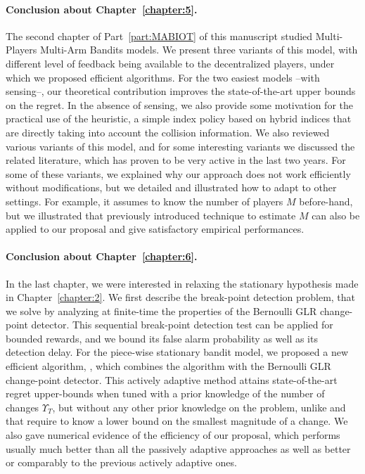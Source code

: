 \paragraph{Conclusion about \textbf{Chapter~\ref{chapter:5}}.}

The second chapter of Part~\ref{part:MABIOT} of this manuscript studied Multi-Players Multi-Arm Bandits models.
%
We present three variants of this model,
with different level of feedback being available to the decentralized players, under which we proposed efficient algorithms.
For the two easiest models --with sensing--, our theoretical contribution improves the state-of-the-art upper bounds on the regret. In the absence of sensing, we also provide some motivation for the practical use of the \Selfish{} heuristic, a simple index policy based on hybrid indices that are directly taking  into account the collision information.
%
We also reviewed various variants of this model, and for some interesting variants we discussed the related literature, which has proven to be very active in the last two years.
For some of these variants, we explained why our approach does not work efficiently without modifications, but we detailed and illustrated how to adapt \MCTopM{} to other settings.
For example, it assumes to know the number of players $M$ before-hand, but we illustrated that previously introduced technique to estimate $M$ can also be applied to our proposal and give satisfactory empirical performances.


\paragraph{Conclusion about \textbf{Chapter~\ref{chapter:6}}.}

In the last chapter, we were interested in relaxing the stationary hypothesis made in Chapter~\ref{chapter:2}.
%
We first describe the break-point detection problem, that we solve by analyzing at finite-time the properties of the Bernoulli GLR change-point detector. This sequential break-point detection test can be applied for bounded rewards, and we bound its false alarm probability as well as its detection delay.
For the piece-wise stationary bandit model,
we proposed a new efficient algorithm, \GLRklUCB, which combines the \klUCB{} algorithm with the Bernoulli GLR change-point detector.
This actively adaptive method attains state-of-the-art regret upper-bounds when tuned with a prior knowledge of the number of changes $\Upsilon_T$, but without any other prior knowledge on the problem, unlike \CUSUMUCB{} and \MUCB{} that require to know a lower bound on the smallest magnitude of a change.
We also gave numerical evidence of the efficiency of our proposal, which performs usually much better than all the passively adaptive approaches as well as better or comparably to the previous actively adaptive ones.



